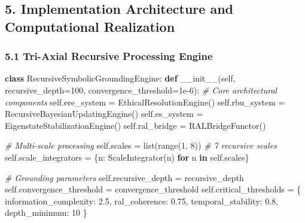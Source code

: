 \documentclass[
]{article}
\newenvironment{Shaded}{}{}
\newcommand{\BuiltInTok}[1]{\textcolor[rgb]{0.00,0.50,0.00}{#1}}
\newcommand{\CommentTok}[1]{\textcolor[rgb]{0.38,0.63,0.69}{\textit{#1}}}
\newcommand{\ControlFlowTok}[1]{\textcolor[rgb]{0.00,0.44,0.13}{\textbf{#1}}}
\newcommand{\DecValTok}[1]{\textcolor[rgb]{0.25,0.63,0.44}{#1}}
\newcommand{\FloatTok}[1]{\textcolor[rgb]{0.25,0.63,0.44}{#1}}
\newcommand{\FunctionTok}[1]{\textcolor[rgb]{0.02,0.16,0.49}{#1}}
\newcommand{\KeywordTok}[1]{\textcolor[rgb]{0.00,0.44,0.13}{\textbf{#1}}}
\newcommand{\NormalTok}[1]{#1}
\newcommand{\OperatorTok}[1]{\textcolor[rgb]{0.40,0.40,0.40}{#1}}
\newcommand{\StringTok}[1]{\textcolor[rgb]{0.25,0.44,0.63}{#1}}
\newcommand{\VariableTok}[1]{\textcolor[rgb]{0.10,0.09,0.49}{#1}}
\begin{document}
\subsection{5. Implementation Architecture and Computational
Realization}\label{implementation-architecture-and-computational-realization}

\subsubsection{5.1 Tri-Axial Recursive Processing
Engine}\label{tri-axial-recursive-processing-engine}

\begin{Shaded}
\begin{Highlighting}[]
\KeywordTok{class}\NormalTok{ RecursiveSymbolicGroundingEngine:}
    \KeywordTok{def} \FunctionTok{\_\_init\_\_}\NormalTok{(}\VariableTok{self}\NormalTok{, recursive\_depth}\OperatorTok{=}\DecValTok{100}\NormalTok{, convergence\_threshold}\OperatorTok{=}\FloatTok{1e{-}6}\NormalTok{):}
        \CommentTok{\# Core architectural components}
        \VariableTok{self}\NormalTok{.ere\_system }\OperatorTok{=}\NormalTok{ EthicalResolutionEngine()}
        \VariableTok{self}\NormalTok{.rbu\_system }\OperatorTok{=}\NormalTok{ RecursiveBayesianUpdatingEngine()}
        \VariableTok{self}\NormalTok{.es\_system }\OperatorTok{=}\NormalTok{ EigenstateStabilizationEngine()}
        \VariableTok{self}\NormalTok{.ral\_bridge }\OperatorTok{=}\NormalTok{ RALBridgeFunctor()}

        \CommentTok{\# Multi{-}scale processing}
        \VariableTok{self}\NormalTok{.scales }\OperatorTok{=} \BuiltInTok{list}\NormalTok{(}\BuiltInTok{range}\NormalTok{(}\DecValTok{1}\NormalTok{, }\DecValTok{8}\NormalTok{))  }\CommentTok{\# 7 recursive scales}
        \VariableTok{self}\NormalTok{.scale\_integrators }\OperatorTok{=}\NormalTok{ \{n: ScaleIntegrator(n) }\ControlFlowTok{for}\NormalTok{ n }\KeywordTok{in} \VariableTok{self}\NormalTok{.scales\}}

        \CommentTok{\# Grounding parameters}
        \VariableTok{self}\NormalTok{.recursive\_depth }\OperatorTok{=}\NormalTok{ recursive\_depth}
        \VariableTok{self}\NormalTok{.convergence\_threshold }\OperatorTok{=}\NormalTok{ convergence\_threshold}
        \VariableTok{self}\NormalTok{.critical\_thresholds }\OperatorTok{=}\NormalTok{ \{}
            \StringTok{\textquotesingle{}information\_complexity\textquotesingle{}}\NormalTok{: }\FloatTok{2.5}\NormalTok{,}
            \StringTok{\textquotesingle{}ral\_coherence\textquotesingle{}}\NormalTok{: }\FloatTok{0.75}\NormalTok{,}
            \StringTok{\textquotesingle{}temporal\_stability\textquotesingle{}}\NormalTok{: }\FloatTok{0.8}\NormalTok{,}
            \StringTok{\textquotesingle{}depth\_minimum\textquotesingle{}}\NormalTok{: }\DecValTok{10}
\NormalTok{        \}}


\end{Highlighting}
\end{Shaded}
\end{document}
